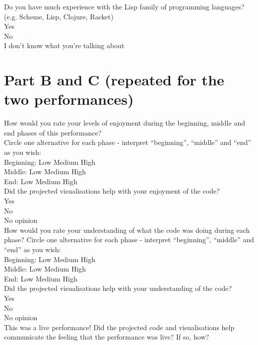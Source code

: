 Do you have much experience with the Lisp family of programming languages? (e.g. Scheme, Lisp, Clojure, Racket)\\
Yes\\
No\\
I don’t know what you’re talking about\\

\section*{Part B and C (repeated for the two performances)}

How would you rate your levels of enjoyment during the beginning, middle and end phases of this performance?\\
Circle one alternative for each phase - interpret “beginning”, “middle” and “end” as you wish:\\

Beginning: Low Medium High\\

Middle: Low Medium High\\

End: Low Medium High\\

Did the projected visualisations help with your enjoyment of the code?\\
Yes\\
No\\
No opinion\\

How would you rate your understanding of what the code was doing during each phase? Circle one alternative for each phase - interpret “beginning”, “middle” and “end” as you wish:\\

Beginning: Low Medium High\\

Middle: Low Medium High\\

End: Low Medium High\\

Did the projected visualisations help with your understanding of the code?\\
Yes\\
No\\
No opinion\\

This was a live performance! Did the projected code and visualisations help communicate the feeling that the performance was live? If so, how?\\

